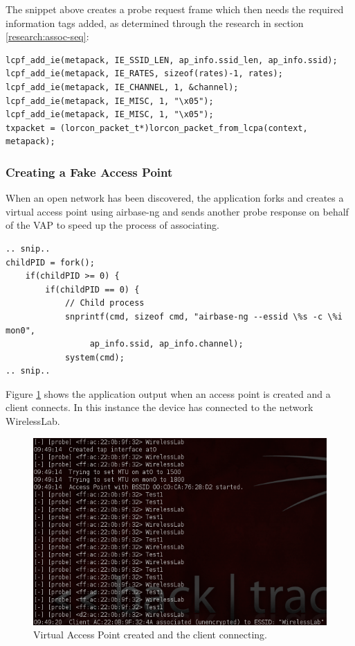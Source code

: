 The snippet above creates a probe request frame which then needs the required information tags added, as determined through the research in section \ref{research:assoc-seq}:

\begin{verbatim}
lcpf_add_ie(metapack, IE_SSID_LEN, ap_info.ssid_len, ap_info.ssid);
lcpf_add_ie(metapack, IE_RATES, sizeof(rates)-1, rates);
lcpf_add_ie(metapack, IE_CHANNEL, 1, &channel);
lcpf_add_ie(metapack, IE_MISC, 1, "\x05");
lcpf_add_ie(metapack, IE_MISC, 1, "\x05");
txpacket = (lorcon_packet_t*)lorcon_packet_from_lcpa(context, metapack);
\end{verbatim}

\subsubsection{Creating a Fake Access Point}

When an open network has been discovered, the application forks and creates a virtual access point using airbase-ng and sends another probe response on behalf of the VAP to speed up the process of associating. 

\begin{verbatim}
.. snip..
childPID = fork();
	if(childPID >= 0) {
		if(childPID == 0) {
			// Child process
			snprintf(cmd, sizeof cmd, "airbase-ng --essid \%s -c \%i mon0",
				 ap_info.ssid, ap_info.channel);
			system(cmd);
.. snip..
\end{verbatim}

Figure \ref{client-connected} shows the application output when an access point is created and a client connects. In this instance the device has connected to the network WirelessLab.

\begin{figure}[h!]
\centering\includegraphics[width=\linewidth]{implementation/figures/client-assoc-1.png}
\caption{Virtual Access Point created and the client connecting.}
\label{client-connected}
\end{figure}

